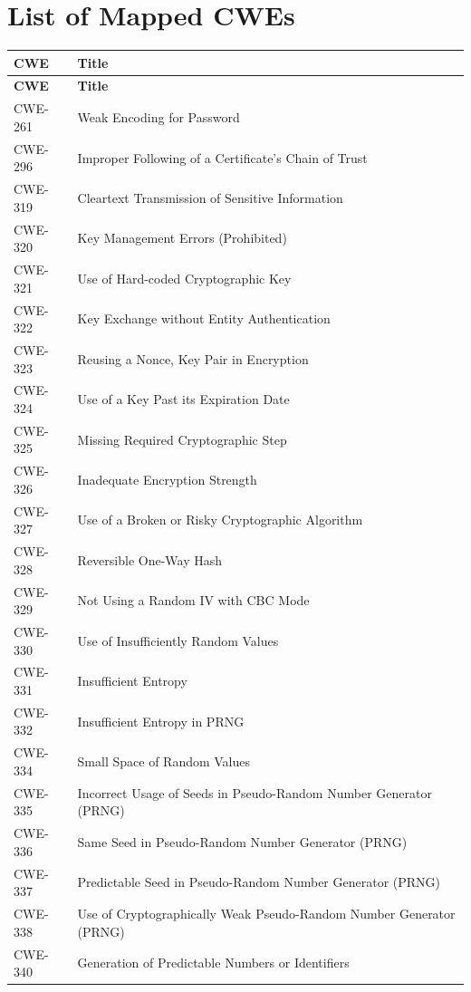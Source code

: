 \documentclass[11pt]{article}
\begin{document}
\section{List of Mapped CWEs}
\renewcommand{\arraystretch}{1.1}
\begin{longtable}{@{}p{2.4cm}p{12.0cm}@{}}
\toprule
\textbf{CWE} & \textbf{Title} \\
\midrule
\endfirsthead
\toprule
\textbf{CWE} & \textbf{Title} \\
\midrule
\endhead
\bottomrule
\endfoot

CWE-261  & Weak Encoding for Password \\
CWE-296  & Improper Following of a Certificate's Chain of Trust \\
CWE-319  & Cleartext Transmission of Sensitive Information \\
CWE-320  & Key Management Errors (Prohibited) \\
CWE-321  & Use of Hard-coded Cryptographic Key \\
CWE-322  & Key Exchange without Entity Authentication \\
CWE-323  & Reusing a Nonce, Key Pair in Encryption \\
CWE-324  & Use of a Key Past its Expiration Date \\
CWE-325  & Missing Required Cryptographic Step \\
CWE-326  & Inadequate Encryption Strength \\
CWE-327  & Use of a Broken or Risky Cryptographic Algorithm \\
CWE-328  & Reversible One-Way Hash \\
CWE-329  & Not Using a Random IV with CBC Mode \\
CWE-330  & Use of Insufficiently Random Values \\
CWE-331  & Insufficient Entropy \\
CWE-332  & Insufficient Entropy in PRNG \\
CWE-334  & Small Space of Random Values \\
CWE-335  & Incorrect Usage of Seeds in Pseudo-Random Number Generator (PRNG) \\
CWE-336  & Same Seed in Pseudo-Random Number Generator (PRNG) \\
CWE-337  & Predictable Seed in Pseudo-Random Number Generator (PRNG) \\
CWE-338  & Use of Cryptographically Weak Pseudo-Random Number Generator (PRNG) \\
CWE-340  & Generation of Predictable Numbers or Identifiers \\

\end{longtable}
\end{document}
